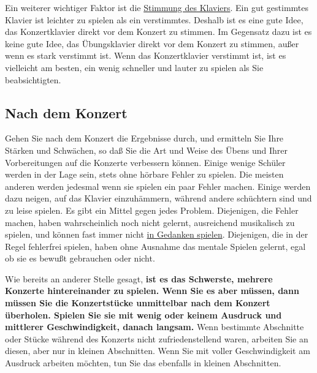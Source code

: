 \hypertarget{c1iii14Stimmung}{}

Ein weiterer wichtiger Faktor ist die \hyperref[c2_1]{Stimmung des Klaviers}.
Ein gut gestimmtes Klavier ist leichter zu spielen als ein verstimmtes.
Deshalb ist es eine gute Idee, das Konzertklavier direkt vor dem Konzert zu stimmen.
Im Gegensatz dazu ist es keine gute Idee, das Übungsklavier direkt vor dem Konzert zu stimmen, außer wenn es stark verstimmt ist.
Wenn das Konzertklavier verstimmt ist, ist es vielleicht am besten, ein wenig schneller und lauter zu spielen als Sie beabsichtigten.


\subsection{Nach dem Konzert}
\label{c1iii14i}

Gehen Sie nach dem Konzert die Ergebnisse durch, und ermitteln Sie Ihre Stärken und Schwächen, so daß Sie die Art und Weise des Übens und Ihrer Vorbereitungen auf die Konzerte verbessern können.
Einige wenige Schüler werden in der Lage sein, stets ohne hörbare Fehler zu spielen.
Die meisten anderen werden jedesmal wenn sie spielen ein paar Fehler machen.
Einige werden dazu neigen, auf das Klavier einzuhämmern, während andere schüchtern sind und zu leise spielen.
Es gibt ein Mittel gegen jedes Problem.
Diejenigen, die Fehler machen, haben wahrscheinlich noch nicht gelernt, ausreichend musikalisch zu spielen, und können fast immer nicht \hyperref[c1ii12mental]{in Gedanken spielen}.
Diejenigen, die in der Regel fehlerfrei spielen, haben ohne Ausnahme das mentale Spielen gelernt, egal ob sie es bewußt gebrauchen oder nicht.

Wie bereits an anderer Stelle gesagt, \textbf{ist es das Schwerste, mehrere Konzerte hintereinander zu spielen.
Wenn Sie es aber müssen, dann müssen Sie die Konzertstücke unmittelbar nach dem Konzert überholen.
Spielen Sie sie mit wenig oder keinem Ausdruck und mittlerer Geschwindigkeit, danach langsam.}
Wenn bestimmte Abschnitte oder Stücke während des Konzerts nicht zufriedenstellend waren, arbeiten Sie an diesen, aber nur in kleinen Abschnitten.
Wenn Sie mit voller Geschwindigkeit am Ausdruck arbeiten möchten, tun Sie das ebenfalls in kleinen Abschnitten.



